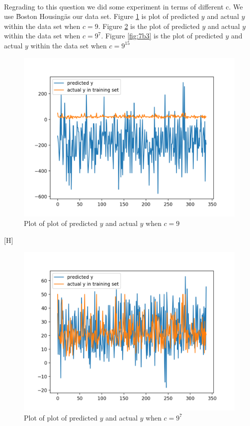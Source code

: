 \documentclass[A4,12pt]{article}
\begin{document}
\begin{enumerate}[6.]
\begin{enumerate}[7.]
\begin{enumerate}[(b)]
    \\Regrading to this question we did some experiment in terms of different c. We use \"Boston Housing\" as our data set. Figure \ref{fig:7b1} is plot of predicted $y$ and actual $y$ within the data set when $c = 9$. Figure \ref{fig:7b2} is the plot of predicted $y$ and actual $y$ within the data set when $c = 9^7$. Figure \ref{fig:7b3} is the plot of predicted $y$ and actual $y$ within the data set when $c = 9^{15}$
    \begin{figure}[!htb]
        \centering \includegraphics[width=0.8\columnwidth]{7b1}
        \caption{
          \label{fig:7b1}
          Plot of plot of predicted $y$ and actual $y$ when $c = 9$
        }
    \end{figure}[H]
    \begin{figure}[!htb]
        \centering \includegraphics[width=0.8\columnwidth]{7b2}
        \caption{
          \label{fig:7b2}
          Plot of plot of predicted $y$ and actual $y$ when $c = 9^7$
        }
    \end{figure}

\end{enumerate}
\end{enumerate}
\end{enumerate}
\end{document}
